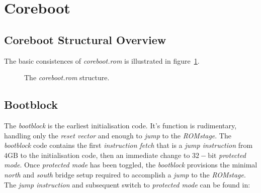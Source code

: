 %
%
%

\section{Coreboot}

\subsection{Coreboot Structural Overview}

The basic consistences of \emph{coreboot.rom} is illustrated in
figure~\ref{fig:coreboot.rom}.

\begin{figure}[ht!]
  \begin{center}
    \caption{The \emph{coreboot.rom} structure.}
    \label{fig:coreboot.rom}
  \end{center}
\end{figure}

\subsection{Bootblock}

The \emph{bootblock} is the earliest initialisation code. It's function is
rudimentary, handling only the \emph{reset vector} and enough to \emph{jump} to
the \emph{ROMstage}. The \emph{bootblock} code contains the first
\emph{instruction fetch} that is a \emph{jump instruction} from $4\mbox{GB}$ to
the initialisation code, then an immediate change to $32-\mbox{bit}$
\emph{protected mode}. Once \emph{protected mode} has been toggled, the
\emph{bootblock} provisions the minimal \emph{north} and \emph{south} bridge
setup required to accomplish a \emph{jump} to the \emph{ROMstage}. The
\emph{jump instruction} and subsequent switch to \emph{protected mode} can be
found in:

